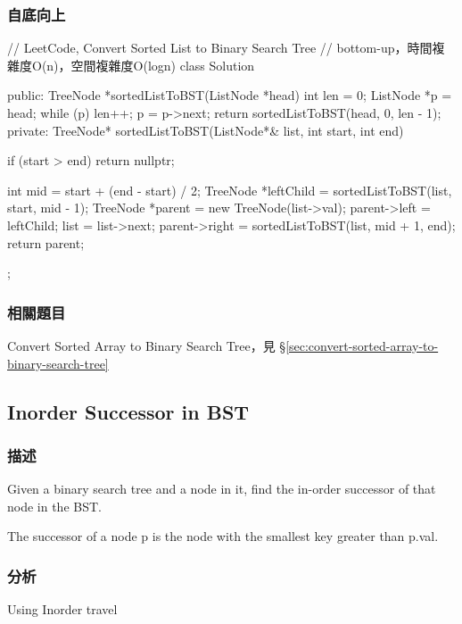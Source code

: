 \subsubsection{自底向上}
\begin{Code}
// LeetCode, Convert Sorted List to Binary Search Tree
// bottom-up，時間複雜度O(n)，空間複雜度O(logn)
class Solution {
public:
    TreeNode *sortedListToBST(ListNode *head) {
        int len = 0;
        ListNode *p = head;
        while (p) {
            len++;
            p = p->next;
        }
        return sortedListToBST(head, 0, len - 1);
    }
private:
    TreeNode* sortedListToBST(ListNode*& list, int start, int end) {
        if (start > end) return nullptr;

        int mid = start + (end - start) / 2;
        TreeNode *leftChild = sortedListToBST(list, start, mid - 1);
        TreeNode *parent = new TreeNode(list->val);
        parent->left = leftChild;
        list = list->next;
        parent->right = sortedListToBST(list, mid + 1, end);
        return parent;
    }
};
\end{Code}


\subsubsection{相關題目}
\begindot
\item Convert Sorted Array to Binary Search Tree，見 \S \ref{sec:convert-sorted-array-to-binary-search-tree}
\myenddot

\subsection{Inorder Successor in BST}
\label{sec:inorder-successor-in-bst}

\subsubsection{描述}
Given a binary search tree and a node in it, find the in-order successor of that node in the BST.

The successor of a node p is the node with the smallest key greater than p.val.

\subsubsection{分析}
Using Inorder travel

